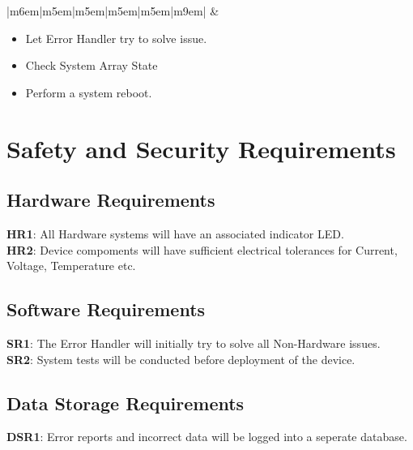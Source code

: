 \documentclass{article}
\begin{document}
\begin{tabular}{|m{6em}|m{5em}|m{5em}|m{5em}|m{5em}|m{9em}|}
        & \begin{minipage}[t]{\linewidth}
              \begin{itemize}[nosep, wide=0pt, leftmargin=*, after=\strut]
	            \item Let Error Handler try to solve issue.
	            \item Check System Array State
		    \item Perform a system reboot.
               \end{itemize}
            \end{minipage}  \tabularnewline{}
\end{tabular}%









\section{Safety and Security Requirements}

\subsection{Hardware Requirements}
\textbf{HR1}: All Hardware systems will have an associated indicator LED.\\
\textbf{HR2}: Device compoments will have sufficient electrical tolerances for Current, Voltage, Temperature etc.

\subsection{Software  Requirements}
\textbf{SR1}: The Error Handler will initially try to solve all Non-Hardware issues.\\
\textbf{SR2}: System tests will be conducted before deployment of the device.\\


\subsection{Data Storage Requirements }
\textbf{DSR1}: Error reports and incorrect data will be logged into a seperate database.\\
\end{document}
